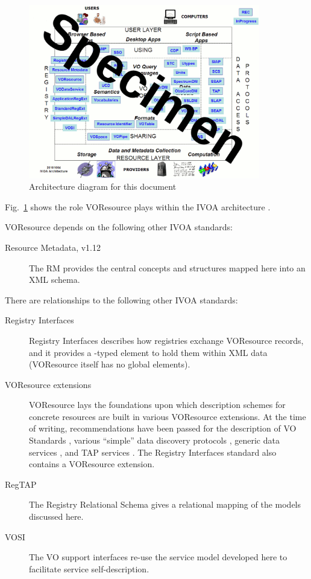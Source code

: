 \documentclass[11pt,a4paper]{ivoa}
\begin{document}
\begin{figure}
\centering

\includegraphics[width=0.9\textwidth]{archdiag.png}
\caption{Architecture diagram for this document}
\label{fig:archdiag}
\end{figure}

Fig.~\ref{fig:archdiag} shows the role VOResource plays within the
IVOA architecture \citep{note:VOARCH}.

VOResource depends on the following other IVOA standards:

\begin{description}
\item[Resource Metadata, v1.12 \citep{2007ivoa.spec.0302H}] The RM
provides the central concepts and structures mapped here into an XML
schema.
\end{description}


There are relationships to the following other IVOA standards:

\begin{description}
\item[Registry Interfaces \citep{2009ivoa.spec.1104B}] Registry
Interfaces describes how registries exchange VOResource records, and it
provides a -typed element to hold them within XML
data (VOResource itself has no global elements).
\item[VOResource extensions] VOResource lays the foundations upon which
description schemes for concrete resources are built in various
VOResource extensions.  At the time of writing, recommendations have
been passed for the description of VO Standards
\citep{2012ivoa.spec.0508H}, various ``simple'' data discovery protocols
\citep{2013ivoa.spec.1125P}, generic data services
\citep{2010ivoa.spec.1202P}, and TAP services
\citep{2012ivoa.spec.0827D}.  The Registry Interfaces standard also
contains a VOResource extension.
\item[RegTAP \citep{2014ivoa.spec.1208D}] The Registry Relational Schema
gives a relational mapping of the models discussed here.
\item[VOSI \citep{2011ivoa.spec.0531G}] The VO support interfaces re-use
the service model developed here to facilitate service self-description.
\end{description}
\end{document}
